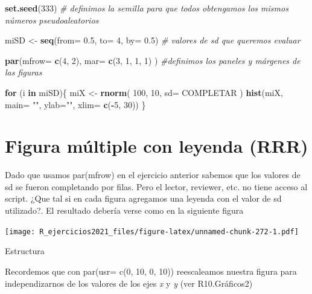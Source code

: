\documentclass[]{book}
\newenvironment{Shaded}{\begin{snugshade}}{\end{snugshade}}
\newcommand{\CommentTok}[1]{\textcolor[rgb]{0.56,0.35,0.01}{\textit{#1}}}
\newcommand{\ControlFlowTok}[1]{\textcolor[rgb]{0.13,0.29,0.53}{\textbf{#1}}}
\newcommand{\DataTypeTok}[1]{\textcolor[rgb]{0.13,0.29,0.53}{#1}}
\newcommand{\DecValTok}[1]{\textcolor[rgb]{0.00,0.00,0.81}{#1}}
\newcommand{\FloatTok}[1]{\textcolor[rgb]{0.00,0.00,0.81}{#1}}
\newcommand{\KeywordTok}[1]{\textcolor[rgb]{0.13,0.29,0.53}{\textbf{#1}}}
\newcommand{\NormalTok}[1]{#1}
\newcommand{\OperatorTok}[1]{\textcolor[rgb]{0.81,0.36,0.00}{\textbf{#1}}}
\newcommand{\StringTok}[1]{\textcolor[rgb]{0.31,0.60,0.02}{#1}}
\begin{document}
\begin{Shaded}
\begin{Highlighting}[]
\KeywordTok{set.seed}\NormalTok{(}\DecValTok{333}\NormalTok{) }\CommentTok{# definimos la semilla para que todos obtengamos los mismos números pseudoaleatorios}

\NormalTok{miSD <-}\StringTok{ }\KeywordTok{seq}\NormalTok{(}\DataTypeTok{from=} \FloatTok{0.5}\NormalTok{, }\DataTypeTok{to=} \DecValTok{4}\NormalTok{, }\DataTypeTok{by=} \FloatTok{0.5}\NormalTok{) }\CommentTok{# valores de sd que queremos evaluar}

\KeywordTok{par}\NormalTok{(}\DataTypeTok{mfrow=} \KeywordTok{c}\NormalTok{(}\DecValTok{4}\NormalTok{, }\DecValTok{2}\NormalTok{), }\DataTypeTok{mar=} \KeywordTok{c}\NormalTok{(}\DecValTok{3}\NormalTok{, }\DecValTok{1}\NormalTok{, }\DecValTok{1}\NormalTok{, }\DecValTok{1}\NormalTok{) ) }\CommentTok{#definimos los paneles y márgenes de las figuras}

  \ControlFlowTok{for}\NormalTok{ (i }\ControlFlowTok{in}\NormalTok{ miSD)\{}
\NormalTok{    miX <-}\StringTok{ }\KeywordTok{rnorm}\NormalTok{( }\DecValTok{100}\NormalTok{, }\DecValTok{10}\NormalTok{, }\DataTypeTok{sd=}\NormalTok{ COMPLETAR )}
    \KeywordTok{hist}\NormalTok{(miX, }\DataTypeTok{main=} \StringTok{""}\NormalTok{, }\DataTypeTok{ylab=}\StringTok{""}\NormalTok{, }\DataTypeTok{xlim=} \KeywordTok{c}\NormalTok{(}\OperatorTok{-}\DecValTok{5}\NormalTok{, }\DecValTok{30}\NormalTok{))}
\NormalTok{    \}}
\end{Highlighting}
\end{Shaded}

\hypertarget{figura-muxfaltiple-con-leyenda-rrr}{%
\section{Figura múltiple con leyenda (RRR)}\label{figura-muxfaltiple-con-leyenda-rrr}}

Dado que usamos par(mfrow) en el ejercicio anterior sabemos que los valores de sd se fueron completando por filas. Pero el lector, reviewer, etc. no tiene acceso al script. ¿Que tal si en cada figura agregamos una leyenda con el valor de sd utilizado?. El resultado debería verse como en la siguiente figura

\texttt{[image: R\_ejercicios2021\_files/figure-latex/unnamed-chunk-272-1.pdf]}

Estructura

Recordemos que con par(usr= c(0, 10, 0, 10)) reescaleamos nuestra figura para independizarnos de los valores de los ejes \emph{x} y \emph{y} (ver R10.Gráficos2)
\end{document}

